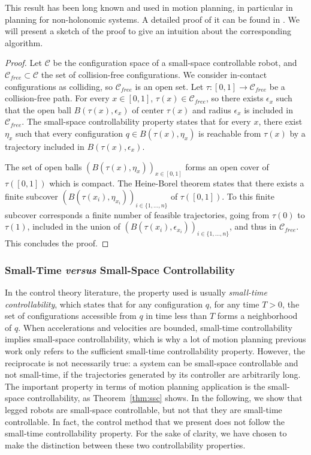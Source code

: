 \documentclass{article}
\begin{document}
This result has been long known and used in motion planning, in particular in planning
for non-holonomic systems. A detailed proof of it can be found in
\cite{taix-94}. We will present a sketch of the proof to give an intuition about the 
corresponding algorithm.

\begin{proof}
  Let $\mathcal{C}$ be the configuration space of a small-space controllable robot, and 
  $\mathcal{C}_{free} \subset \mathcal{C}$ the set of collision-free configurations. We
  consider in-contact configurations as colliding, so $\mathcal{C}_{free}$ is an open set.
  Let $\tau : [0,1] \rightarrow \mathcal{C}_{free}$ be a collision-free path. For every $x \in [0,1]$,
  $\tau(x) \in \mathcal{C}_{free}$, so there exists $\epsilon_x$ such that the open ball 
  $B(\tau(x),\epsilon_x)$ of center $\tau(x)$ and radius $\epsilon_x$ is included in 
  $\mathcal{C}_{free}$. The small-space controllability property states that for every $x$,
  there exist $\eta_x$ such that every configuration $q \in B(\tau(x),\eta_x)$ is reachable 
  from $\tau(x)$ by a trajectory included in $B(\tau(x),\epsilon_x)$.

  The set of open balls $\left( B(\tau(x),\eta_x) \right)_{x\in [0,1]}$ forms an open cover
  of $\tau([0,1])$ which is compact. The Heine-Borel theorem states that there exists a
  finite subcover $\left( B(\tau(x_i),\eta_{x_i}) \right)_{i\in \{ 1,\dots ,n \}}$ of $\tau([0,1])$. To this
  finite subcover corresponds a finite number of feasible trajectories, going from $\tau(0)$ to  
  $\tau(1)$, included in the union of 
  $\left( B(\tau(x_i),\epsilon_{x_i}) \right)_{i\in \{ 1,\dots ,n \}}$, and thus in 
  $\mathcal{C}_{free}$. This concludes the proof.
\end{proof}

\subsubsection{Small-Time \textit{versus} Small-Space Controllability}
In the control theory literature, the property used is usually \textit{small-time controllability}, 
which states that for  any configuration  $q$, for  any time
$T>0$, the set of configurations accessible from $q$ in time less than
$T$ forms a  neighborhood of $q$. When accelerations and velocities are bounded,
small-time controllability implies small-space controllability, which is why 
a lot of motion planning previous work only refers to the sufficient small-time controllability
property. However, the reciprocate is not necessarily true:  a system can be 
small-space controllable and
not small-time, if the trajectories generated by its controller are arbitrarily long.
The important property
in terms of motion planning application is the small-space controllability, as 
Theorem~\ref{thm:ssc} shows. In the following, we show that legged robots
are small-space controllable, but  not that they are small-time controllable.
In fact, the  control method that we present does not follow the small-time controllability
property. For the sake of clarity, we have chosen to make the distinction between these
two controllability properties.
\end{document}
